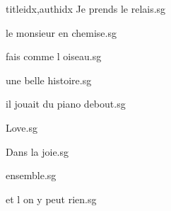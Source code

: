 \documentclass[
    ]{article}
\begin{document}
\begin{songs}{titleidx,authidx}
{Je prends le relais.sg}


{le monsieur en chemise.sg}


{fais comme l oiseau.sg}


{une belle histoire.sg}


{il jouait du piano debout.sg}


{Love.sg}


{Dans la joie.sg}


{ensemble.sg}


{et l on y peut rien.sg}



\end{songs}
\end{document}
